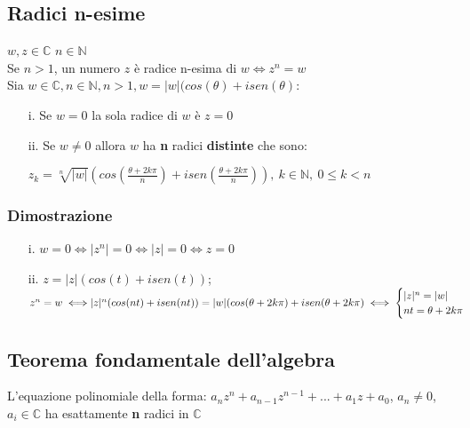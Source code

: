 \subsection{Radici n-esime}
$w,z \in \mathbb{C}$\; $n \in \mathbb{N}$\\
Se $n>1$, un numero $z$ è radice n-esima di $w \iff z^n=w$\\
Sia $w \in \mathbb{C}, n \in \mathbb{N}, n>1, w=|w|(cos(\theta)+isen(\theta)$:\\
\begin{enumerate}
\item[i.] Se $w=0$ la sola radice di $w$ è $z=0$
\item[ii.] Se $w\neq0$ allora $w$ ha \textbf{n} radici \textbf{distinte} che sono:\\
\begin{Large}
$z_k=\sqrt[n]{|w|}(cos(\frac{\theta+2k\pi}{n})+isen(\frac{\theta+2k\pi}{n})),\ k \in \mathbb{N},\ 0\leq k<n$
\end{Large}
\end{enumerate}
\subsubsection{Dimostrazione}
\begin{enumerate}
\item[i.]$w=0 \iff |z^n|=0 \iff |z|=0 \iff z=0$
\item[ii.]$z=|z|(cos(t)+isen(t))$; $z^n=w \iff \\
|z|^n(cos(nt)+isen(nt)) = |w|(cos(\theta+2k\pi)+isen(\theta +2k\pi) \iff
\begin{cases}
|z|^n = |w|\\
nt = \theta +2k\pi
\end{cases}$
\end{enumerate}
\subsection{Teorema fondamentale dell'algebra}
L'equazione polinomiale della forma: $a_nz^n + a_{n-1}z^{n-1}+...+a_1z+a_0$, $a_n \neq 0$, $a_i \in \mathbb{C}$ ha esattamente \textbf{n} radici in $\mathbb{C}$
